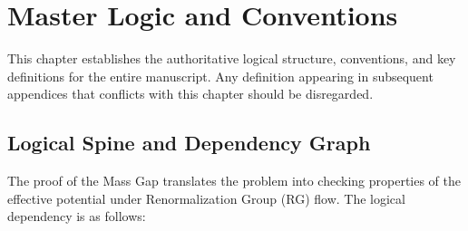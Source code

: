 \chapter{Master Logic and Conventions}
\label{ch:master_logic}

This chapter establishes the authoritative logical structure, conventions, and key definitions for the entire manuscript. Any definition appearing in subsequent appendices that conflicts with this chapter should be disregarded.

\section{Logical Spine and Dependency Graph}

The proof of the Mass Gap translates the problem into checking properties of the effective potential under Renormalization Group (RG) flow. The logical dependency is as follows:

